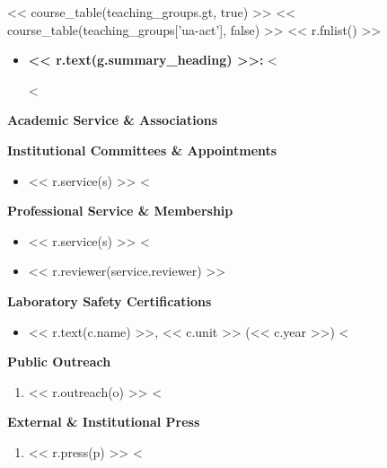 \documentclass[11pt]{article}
\begin{document}
<< course_table(teaching_groups.gt, true) >>
<< course_table(teaching_groups['ua-act'], false) >>
<< r.fnlist() >>

\begin{itemize}[leftmargin=*,nosep]
<%
<%
    \item \textbf{<< r.text(g.summary_heading) >>:} <%

<%
\end{itemize}

\medskip

{\Large\textbf{Academic Service \& Associations}}

{\large\textbf{Institutional Committees \& Appointments}}

\begin{itemize}[leftmargin=*,nosep]
<%
    \item << r.service(s) >>
<%
\end{itemize}

{\large\textbf{Professional Service \& Membership}}

\begin{itemize}[leftmargin=*,nosep]
<%
    \item << r.service(s) >>
<%
    \item << r.reviewer(service.reviewer) >>
\end{itemize}

{\large\textbf{Laboratory Safety Certifications}}

\begin{itemize}[leftmargin=*,nosep]
<%
    \item << r.text(c.name) >>, << c.unit >> (<< c.year >>)
<%
\end{itemize}

{\large\textbf{Public Outreach}}

\begin{enumerate}[leftmargin=*,nosep]
<%
    \item << r.outreach(o) >>
<%
\end{enumerate}

\medskip

{\Large\textbf{External \& Institutional Press}}

\begin{enumerate}[leftmargin=*,nosep]
<%
    \item << r.press(p) >>
<%
\end{enumerate}
\end{document}
